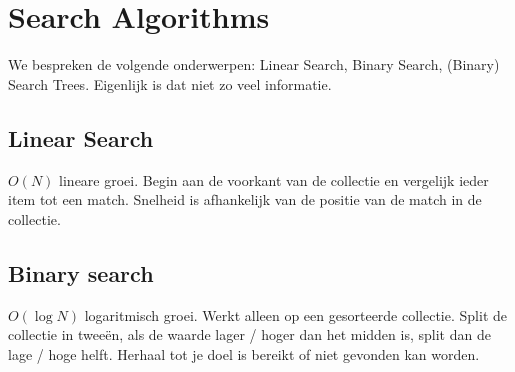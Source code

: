 \section{Search Algorithms}
We bespreken de volgende onderwerpen: Linear Search, Binary Search, (Binary) Search Trees.
Eigenlijk is dat niet zo veel informatie.

\subsection{Linear Search}
$O(N)$ lineare groei.
Begin aan de voorkant van de collectie en vergelijk ieder item tot een match.
Snelheid is afhankelijk van de positie van de match in de collectie.

\subsection{Binary search}
$O(\log N)$ logaritmisch groei.
Werkt alleen op een gesorteerde collectie.
Split de collectie in tweeën, als de waarde lager / hoger dan het midden is, split dan de lage / hoge helft.
Herhaal tot je doel is bereikt of niet gevonden kan worden.
